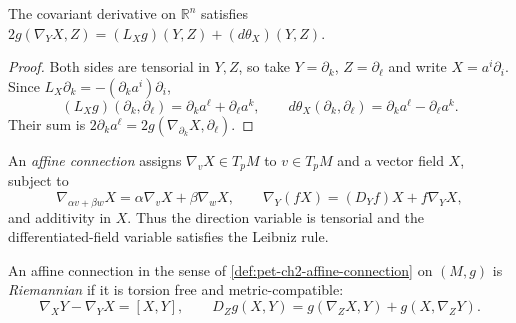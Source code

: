 \begin{proposition}
  \label{prop:pet-ch2-covariant-derivative-implicit-euclidean}


  The covariant derivative on $\mathbb{R}^n$ satisfies
  $2g(\nabla_YX,Z)=(L_Xg)(Y,Z)+(d\theta_X)(Y,Z)$.
\end{proposition}
\begin{proof}

  \sketch
  Both sides are
  tensorial in $Y,Z$, so take $Y=\partial_k$, $Z=\partial_\ell$ and write
  $X=a^i\partial_i$. Since
  $L_X\partial_k=-(\partial_k a^i)\partial_i$,
  \[
    (L_Xg)(\partial_k,\partial_\ell)
       =\partial_k a^\ell+\partial_\ell a^k,\qquad
    d\theta_X(\partial_k,\partial_\ell)
       =\partial_k a^\ell-\partial_\ell a^k.
  \]
  Their sum is $2\partial_k a^\ell
  =2g(\nabla_{\partial_k}X,\partial_\ell)$.
\end{proof}

\begin{definition}
  \label{def:pet-ch2-affine-connection}


  An \emph{affine connection} assigns
  $\nabla_vX\in T_pM$ to $v\in T_pM$ and a vector field $X$, subject to
  \[
    \nabla_{\alpha v+\beta w}X
      =\alpha\nabla_vX+\beta\nabla_wX,
    \qquad
    \nabla_Y(fX)=(D_Yf)X+f\nabla_YX,
  \]
  and additivity in $X$. Thus the direction variable is tensorial and the
  differentiated-field variable satisfies the Leibniz rule.
\end{definition}

\begin{definition}
  \label{def:pet-ch2-riemannian-connection}


  An affine connection in the sense of
  \cref{def:pet-ch2-affine-connection} on $(M,g)$
  is \emph{Riemannian} if it is torsion free and metric-compatible:
  \[
    \nabla_XY-\nabla_YX=[X,Y],
    \qquad
    D_Zg(X,Y)=g(\nabla_ZX,Y)+g(X,\nabla_ZY).
  \]
\end{definition}

